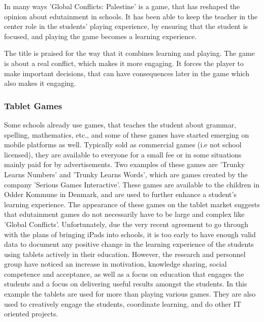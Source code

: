 In many ways 'Global Conflicts: Palestine' is a game, that has reshaped the opinion about edutainment in schools. It has been able to keep the teacher in the center role in the students' playing experience, by ensuring that the student is focused, and playing the game becomes a learning experience.\cite{laeringpaaspil}\newline

The title is praised for the way that it combines learning and playing.
The game is about a real conflict, which makes it more engaging.
It forces the player to make important decisions, that can have consequences later in the game which also makes it engaging.

\subsubsection{Tablet Games}

Some schools already use games, that teaches the student about grammar, spelling, mathematics, etc., and some of these games have started emerging on mobile platforms as well.
Typically sold as commercial games (i.e not school licensed), they are available to everyone for a small fee or in some situations mainly paid for by advertisements.
Two examples of these games are 'Trunky Learns Numbers' and 'Trunky Learns Words', which are games created by the company 'Serious Games Interactive'.
These games are available to the children in Odder Kommune in Denmark, and are used to further enhance a student's learning experience.\cite{odderipad}
The appearance of these games on the tablet market suggests that edutainment games do not necessarily have to be large and complex like 'Global Conflicts'.
Unfortunately, due the very recent agreement to go through with the plans of bringing iPads into schools, it is too early to have enough valid data to document any positive change in the learning experience of the students using tablets actively in their education.
However, the research and personnel group have noticed an increase in motivation, knowledge sharing, social competence and acceptance, as well as a focus on education that engages the students and a focus on delivering useful results amongst the students.\cite{odderipadpjece}
In this example the tablets are used for more than playing various games. They are also used to creatively engage the students, coordinate learning, and do other IT oriented projects.\cite{odderipadpjece}